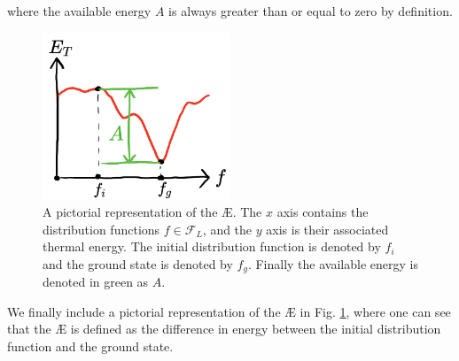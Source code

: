 where the available energy $A$ is always greater than or equal to zero by definition.
\begin{figure}
    \centering
    \includegraphics[width=0.5\textwidth]{3_chapters/0_introduction/img/AE-def.pdf}
    \caption{A pictorial representation of the \AE{}. The $x$ axis contains the distribution functions $f \in \mathcal{F}_L$, and the $y$ axis is their associated thermal energy. The initial distribution function is denoted by $f_i$ and the ground state is denoted by $f_g$. Finally the available energy is denoted in green as $A$.}
    \label{fig: ae def}
\end{figure}
We finally include a pictorial representation of the \AE{} in Fig. \ref{fig: ae def}, where one can see that the \AE{} is defined as the difference in energy between the initial distribution function and the ground state.

